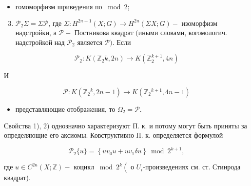\documentclass[10pt]{article}
\begin{document}
\begin{itemize}

  \item гомоморфизм шриведения по $\bmod 2$;

\end{itemize}



\begin{enumerate}

  \setcounter{enumi}{2}

  \item $\mathscr{P}_{2} \Sigma=\Sigma \mathscr{P}$, где $\Sigma: H^{2 n-1}(X ; G) \rightarrow H^{2 n}(\Sigma X ; G)-$ изоморфизм надстройки, а $\mathscr{P}-$ Постникова квадрат (иными словами, когомологич. надстройкой над $\mathscr{P}_{2}$ является $\mathscr{P})$. Если

\end{enumerate}



\[

\mathscr{P}_{2}: K\left(\mathbb{Z}_{2} k, 2 n\right) \longrightarrow K\left(\mathbb{Z}_{2}^{k+1}, 4 n\right)

\]



И



\[

\mathscr{P}: K\left(\mathbb{Z}_{2}{ }^{k}, 2 n-1\right) \longrightarrow K\left(\mathbb{Z}_{2}{ }^{k+1}, 4 n-1\right)

\]



\begin{itemize}

  \item представляющие отображения, то $\Omega_{2}=\mathscr{P}$.

\end{itemize}



Свойства 1), 2) однозначно характеризуют П. к. и потому могут быть приняты за определяющие его аксиомы. Ковструктивно П. к. определяется формулой



\[

\mathscr{P}_{2}\{u\}=\left\{u v_{0} u+u v_{1} \delta u\right\} \bmod 2^{k+1},

\]



где $u \in C^{2 n}(X ; \mathbb{Z})-$ коцикл $\bmod 2^{k}\left(\right.$ о $U_{i}$-произведениях см. ст. Стинрода квадрат).
\end{document}
